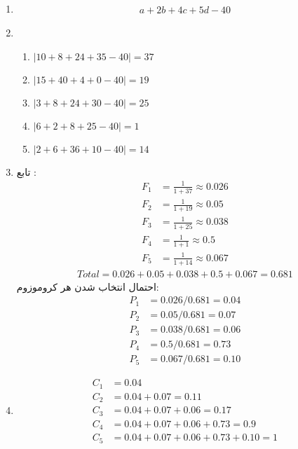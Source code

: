 \begin{enumerate}
    \item \begin{gather*}
        a + 2b + 4c + 5d - 40
    \end{gather*}
    \item \begin{enumerate}
        \item $|10 + 8 + 24 + 35 - 40| = 37$
        \item $|15 + 40 + 4 + 0 - 40| = 19$
        \item $|3 + 8 + 24 + 30 - 40| = 25$
        \item $|6 + 2 + 8 + 25 - 40| = 1$
        \item $|2 + 6 + 36 + 10 - 40| = 14$
    \end{enumerate}
    \item تابع :
    \begin{align*}
        F_1 &= \frac{1}{1+37} \approx 0.026 \\
        F_2 &= \frac{1}{1+19} \approx 0.05 \\
        F_3 &= \frac{1}{1+25} \approx 0.038 \\
        F_4 &= \frac{1}{1+1} \approx 0.5 \\
        F_5 &= \frac{1}{1+14} \approx 0.067
    \end{align*}
    \begin{gather*}
        Total = 0.026 + 0.05 + 0.038 + 0.5 + 0.067 = 0.681
    \end{gather*}
    احتمال انتخاب شدن هر کروموزوم:
    \begin{align*}
        P_1 &= 0.026 / 0.681 = 0.04 \\
        P_2 &= 0.05 / 0.681 = 0.07 \\
        P_3 &= 0.038 / 0.681 = 0.06 \\
        P_4 &= 0.5 / 0.681 = 0.73 \\
        P_5 &= 0.067 / 0.681 = 0.10
    \end{align*}
    \item \begin{align*}
        C_1 &= 0.04 \\
        C_2 &= 0.04 + 0.07 = 0.11 \\
        C_3 &= 0.04 + 0.07 + 0.06 = 0.17 \\
        C_4 &= 0.04 + 0.07 + 0.06 + 0.73 = 0.9 \\
        C_5 &= 0.04 + 0.07 + 0.06 + 0.73 + 0.10 = 1

\end{align*}
\end{enumerate}
